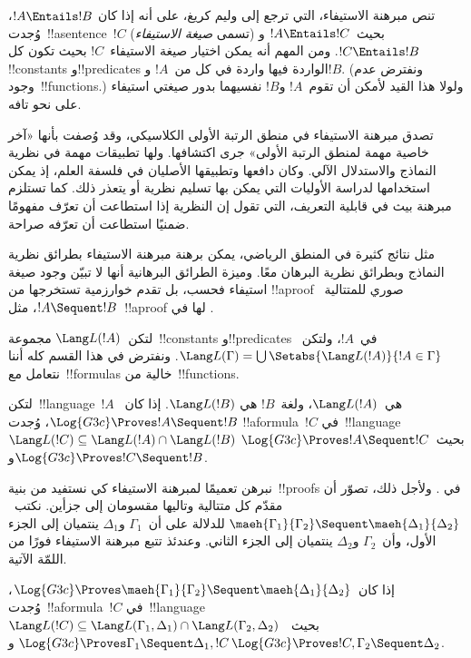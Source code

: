 \documentclass[../../../include/open-logic-section]{subfiles}
\begin{document}


تنص مبرهنة الاستيفاء، التي ترجع إلى وليم كريغ، على أنه إذا كان
$!A \Entails !B$، وُجدت~!!a{sentence}~$!C$ (تسمى
\emph{صيغة الاستيفاء}) بحيث~$!A \Entails !C$ و$!C \Entails !B$.
ومن المهم أنه يمكن اختيار صيغة الاستيفاء~$!C$ بحيث تكون كل
!!{constant}s و!!{predicate}s الواردة فيها واردة في كل من~$!A$ و$!B$.
(ونفترض عدم وجود~!!{function}s.) ولولا هذا القيد لأمكن أن تقوم~$!A$
و$!B$ نفسيهما بدور صيغتي استيفاء على نحو تافه.

تصدق مبرهنة الاستيفاء في منطق الرتبة الأولى الكلاسيكي، وقد وُصفت بأنها
«آخر خاصية مهمة لمنطق الرتبة الأولى» جرى اكتشافها. ولها تطبيقات مهمة في
نظرية النماذج والاستدلال الآلي. وكان دافعها وتطبيقها الأصليان في فلسفة
العلم، إذ يمكن استخدامها لدراسة الأوليات التي يمكن بها تسليم نظرية أو
يتعذر ذلك. كما تستلزم مبرهنة بيث في قابلية التعريف، التي تقول إن
النظرية إذا استطاعت أن تعرّف مفهومًا ضمنيًا استطاعت أن تعرّفه صراحة.

مثل نتائج كثيرة في المنطق الرياضي، يمكن برهنة مبرهنة الاستيفاء بطرائق
نظرية النماذج وبطرائق نظرية البرهان معًا. وميزة الطرائق البرهانية أنها
لا تبيّن وجود صيغة استيفاء فحسب، بل تقدم خوارزمية تستخرجها من
!!a{proof} صوري للمتتالية~$!A \Sequent !B$، مثل~!!a{proof} لها في
.

لتكن~$\Lang L(!A)$ مجموعة~!!{constant}s و!!{predicate}s في~$!A$،
ولتكن~$\Lang L(\Gamma) = \bigcup \Setabs{\Lang L(!A)}{!A \in
\Gamma}$. ونفترض في هذا القسم كله أننا نتعامل مع~!!{formula}s خالية
من~!!{function}s.

\begin{thm}
لتكن~!!{language}~$!A$ هي~$\Lang L(!A)$، ولغة~$!B$ هي
$\Lang L(!B)$. إذا كان~$\Log{G3c} \Proves !A \Sequent !B$، وُجدت
!!a{formula}~$!C$ في~!!{language}~$\Lang L(!C) \subseteq \Lang
L(!A) \cap \Lang L(!B)$ بحيث~$\Log{G3c} \Proves !A \Sequent !C$
و$\Log{G3c} \Proves !C \Sequent !B$.
\end{thm}

نبرهن تعميمًا لمبرهنة الاستيفاء كي نستفيد من بنية~!!{proof}s في
. ولأجل ذلك، تصوّر أن مقدّم كل متتالية وتاليها مقسومان إلى
جزأين. نكتب~$\maeh{\Gamma_1}{\Gamma_2} \Sequent
\maeh{\Delta_1}{\Delta_2}$ للدلالة على أن~$\Gamma_1$ و$\Delta_1$
ينتميان إلى الجزء الأول، وأن~$\Gamma_2$ و$\Delta_2$ ينتميان إلى الجزء
الثاني. وعندئذ تتبع مبرهنة الاستيفاء فورًا من اللمّة الآتية.

\begin{lem}[لمّة ماهارا] إذا كان~$\Log{G3c}
\Proves \maeh{\Gamma_1}{\Gamma_2} \Sequent \maeh{\Delta_1}{\Delta_2}$،
وُجدت~!!a{formula}~$!C$ في~!!{language}~$\Lang L(!C)
\subseteq \Lang L(\Gamma_1,
\Delta_1) \cap \Lang L(\Gamma_2, \Delta_2)$ بحيث~$\Log{G3c}
\Proves \Gamma_1 \Sequent \Delta_1, !C$ و$\Log{G3c} \Proves !C,
\Gamma_2 \Sequent \Delta_2$.
\end{lem}
\end{document}
